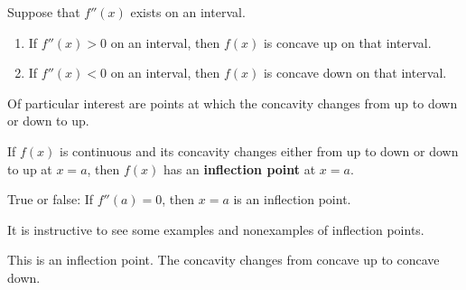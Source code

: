 \documentclass{ximera}
\begin{document}
\begin{theorem}
Suppose that $f''(x)$ exists on an interval.
\begin{enumerate}
\item If $f''(x)>0$ on an interval, then $f(x)$ is concave up on that interval.
\item If $f''(x)<0$ on an interval, then $f(x)$ is concave down on that interval.
\end{enumerate}
\end{theorem}


Of particular interest are points at which the concavity changes from
up to down or down to up. 

\begin{definition}
If $f(x)$ is continuous and its concavity changes either from up to
down or down to up at $x=a$, then $f(x)$ has an \textbf{inflection
  point} at $x=a$.
\end{definition}


\begin{question}
True or false: If $f''(a) = 0$, then $x=a$ is an inflection point.
    \begin{multipleChoice}
    \end{multipleChoice}  
\end{question}



It is instructive to see some examples and nonexamples of inflection
points.

\begin{example}

\begin{image}
\end{image}

This is an inflection point. The concavity changes from concave up to
concave down.
\end{example}
\end{document}
